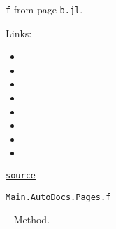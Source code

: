 \begin{adjustwidth}{2em}{0pt}

\texttt{f} from page \texttt{b.jl}.

Links:

\begin{itemize}
\item {}


\item {}


\item {}


\item {}


\item {}


\item {}


\item {}


\item {}

\end{itemize}


\href{https://github.com/BambOoxX/Documenter.jl/blob/d157febde213549ed0d45c894f0651560da477d3/test/examples/pages/b.jl#L2-L16}{\texttt{source}}


\end{adjustwidth}
\hypertarget{18287295168891819021}{\texttt{Main.AutoDocs.Pages.f}}  -- {Method.}

